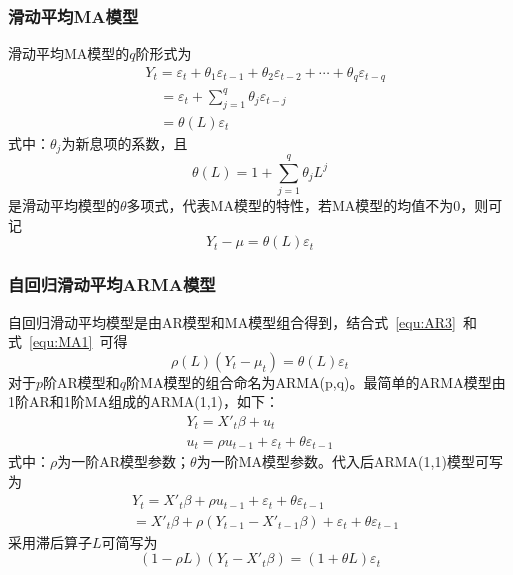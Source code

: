 \subsubsection{滑动平均MA模型}

滑动平均MA模型的$q$阶形式为
\begin{align}
  & {{Y}_{t}}={{\varepsilon }_{t}}+{{\theta }_{1}}{{\varepsilon }_{t-1}}+{{\theta }_{2}}{{\varepsilon }_{t-2}}+\cdots +{{\theta }_{q}}{{\varepsilon }_{t-q}} \nonumber \\ 
 & \quad ={{\varepsilon }_{t}}+\sum\limits_{j=1}^{q}{{{\theta }_{j}}{{\varepsilon }_{t-j}}} \\ 
 & \quad =\theta (L){{\varepsilon }_{t}} \nonumber
\end{align}
式中：${\theta }_{j}$为新息项的系数，且
\begin{equation}
	\theta (L)=1+\sum\limits_{j=1}^{q}{{{\theta }_{j}}{{L}^{j}}}
\end{equation}
是滑动平均模型的${\theta }$多项式，代表MA模型的特性，若MA模型的均值不为0，则可记
\begin{equation}
	\label{equ:MA1}
	{{Y}_{t}}-\mu =\theta (L){{\varepsilon }_{t}}
\end{equation}

\subsubsection{自回归滑动平均ARMA模型}

自回归滑动平均模型是由AR模型和MA模型组合得到，结合式~\ref{equ:AR3}~和式~\ref{equ:MA1}~可得
\begin{equation}
	\rho (L)({{Y}_{t}}-{{\mu }_{t}})=\theta (L){{\varepsilon }_{t}}
\end{equation}
对于$p$阶AR模型和$q$阶MA模型的组合命名为ARMA(p,q)。最简单的ARMA模型由1阶AR和1阶MA组成的ARMA(1,1)，如下：
\begin{gather}
 	{{Y}_{t}}={{{{X}'}}_{t}}\beta +{{u}_{t}} \\ 
	{{u}_{t}}=\rho {{u}_{t-1}}+{{\varepsilon }_{t}}+\theta {{\varepsilon }_{t-1}}
\end{gather}
式中：$\rho$为一阶AR模型参数；$\theta$为一阶MA模型参数。代入后ARMA(1,1)模型可写为
\begin{align}
  & {{Y}_{t}}={{{{X}'}}_{t}}\beta +\rho {{u}_{t-1}}+{{\varepsilon }_{t}}+\theta {{\varepsilon }_{t-1}} \\ 
 & ={{{{X}'}}_{t}}\beta +\rho ({{Y}_{t-1}}-{{{{X}'}}_{t-1}}\beta )+{{\varepsilon }_{t}}+\theta {{\varepsilon }_{t-1}}
\end{align}
采用滞后算子$L$可简写为
\begin{equation}
	(1-\rho L)({{Y}_{t}}-{{{X}'}_{t}}\beta )=(1+\theta L){{\varepsilon }_{t}}
\end{equation}

